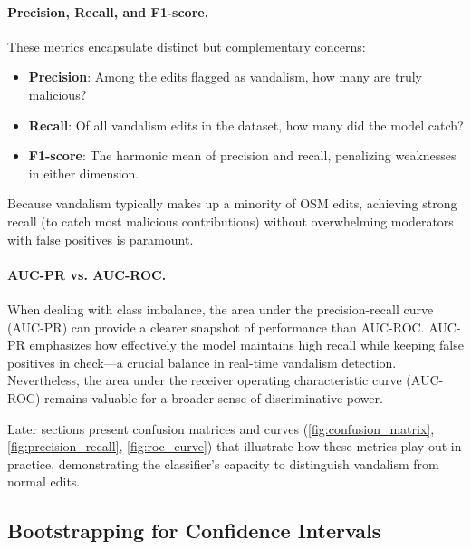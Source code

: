 \documentclass[
    13pt, %
    a4paper, %
    listof=totoc, %
    bibliography=totoc, %
    index=totoc, %
    headsepline
]{scrreprt}
\begin{document}
\paragraph{Precision, Recall, and F1-score.}
These metrics encapsulate distinct but complementary concerns:
\begin{itemize}
    \item \textbf{Precision}: Among the edits flagged as vandalism, how many are truly malicious?
    \item \textbf{Recall}: Of all vandalism edits in the dataset, how many did the model catch?
    \item \textbf{F1-score}: The harmonic mean of precision and recall, penalizing weaknesses in either dimension.
\end{itemize}
Because vandalism typically makes up a minority of OSM edits, achieving strong recall (to catch most malicious contributions) without overwhelming moderators with false positives is paramount.

\paragraph{AUC-PR vs. AUC-ROC.}
\noindent
When dealing with class imbalance, the area under the precision-recall curve (AUC-PR) can provide a clearer snapshot of performance than AUC-ROC. AUC-PR emphasizes how effectively the model maintains high recall while keeping false positives in check—a crucial balance in real-time vandalism detection. Nevertheless, the area under the receiver operating characteristic curve (AUC-ROC) remains valuable for a broader sense of discriminative power.

\noindent
Later sections present confusion matrices and curves (\autoref{fig:confusion_matrix}, \autoref{fig:precision_recall}, \autoref{fig:roc_curve}) that illustrate how these metrics play out in practice, demonstrating the classifier’s capacity to distinguish vandalism from normal edits.

\subsection{Bootstrapping for Confidence Intervals}
\label{sec:bootstrapping_for_ci}
\end{document}
